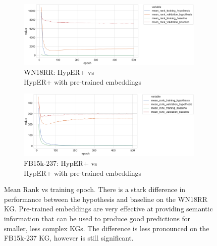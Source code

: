 
\begin{figure}
	\begin{subfigure}[b]{.5\linewidth}
   		\centering
    		\includegraphics[width=1.0\linewidth, height=0.6\linewidth]{WN18RR_mean_rank_Results_ptwv}
		\captionsetup{justification=centering}
		\caption{WN18RR: HypER+ vs \\ HypER+ with pre-trained embeddings}
	\end{subfigure}
	\begin{subfigure}[b]{.5\linewidth}
   		\centering
		\includegraphics[width=1.0\linewidth, height=0.6\linewidth]{FB15k-237_mean_rank_Results_ptwv}
		\captionsetup{justification=centering}
		\caption{FB15k-237: HypER+ vs \\ HypER+ with pre-trained embeddings}
	\end{subfigure}
	\caption{Mean Rank vs training epoch. There is a stark difference in performance between the hypothesis and baseline on the WN18RR KG. Pre-trained embeddings are very effective at providing semantic information that can be used to produce good predictions for smaller, less complex KGs. The difference is less pronounced on the FB15k-237 KG, however is still significant.}
\end{figure}


